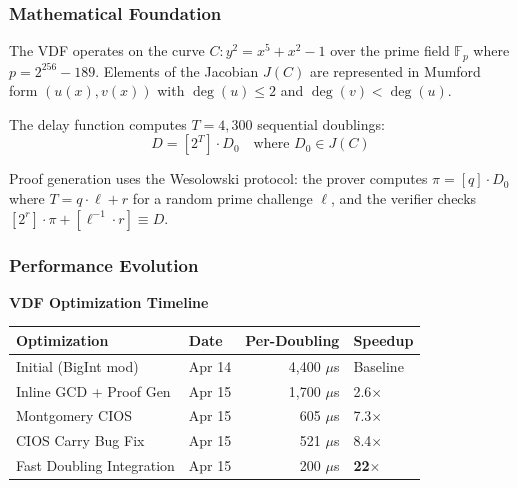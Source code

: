 \documentclass[12pt,a4paper]{article}
\begin{document}
\subsubsection{Mathematical Foundation}

The VDF operates on the curve $C: y^2 = x^5 + x^2 - 1$ over the prime field $\mathbb{F}_p$ where $p = 2^{256} - 189$. Elements of the Jacobian $J(C)$ are represented in Mumford form $(u(x), v(x))$ with $\deg(u) \leq 2$ and $\deg(v) < \deg(u)$.

The delay function computes $T = 4{,}300$ sequential doublings:
\[
D = [2^T] \cdot D_0 \quad \text{where } D_0 \in J(C)
\]

Proof generation uses the Wesolowski protocol: the prover computes $\pi = [q] \cdot D_0$ where $T = q \cdot \ell + r$ for a random prime challenge $\ell$, and the verifier checks $[2^r] \cdot \pi + [\ell^{-1} \cdot r] \equiv D$.

\subsubsection{Performance Evolution}

\begin{center}
\end{center}

\begin{statbox}
\textbf{VDF Optimization Timeline}\\[5pt]
\begin{tabular}{@{}llrl@{}}
\toprule
\textbf{Optimization} & \textbf{Date} & \textbf{Per-Doubling} & \textbf{Speedup} \\
\midrule
Initial (BigInt mod) & Apr 14 & 4{,}400 $\mu$s & Baseline \\
Inline GCD + Proof Gen & Apr 15 & 1{,}700 $\mu$s & 2.6$\times$ \\
Montgomery CIOS & Apr 15 & 605 $\mu$s & 7.3$\times$ \\
CIOS Carry Bug Fix & Apr 15 & 521 $\mu$s & 8.4$\times$ \\
Fast Doubling Integration & Apr 15 & 200 $\mu$s & \textbf{22$\times$} \\
\bottomrule
\end{tabular}
\end{statbox}
\end{document}
